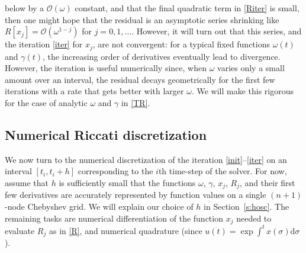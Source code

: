 \documentclass[10pt]{article}
\newcommand{\bigO}{{\mathcal O}}
\newcommand{\om}{\omega}
\newcommand{\g}{\gamma}
\begin{document}
below by a $\bigO(\om)$ constant,
and that the final quadratic term in \eqref{Riter} is small,
then one might hope that the
residual is an asymptotic series
shrinking like $R[x_j] = \bigO(\om^{1-j})$ for $j=0,1,\dots$.
However, it will turn out that this series, and the iteration \cref{iter} for $x_j$, are not convergent:
for a typical fixed functions $\om(t)$ and $\g(t)$,
the increasing order of derivatives eventually lead to divergence.
However, the iteration
is useful numerically since, when $\om$ varies only a small amount
over an interval,
the residual decays geometrically for the first few iterations with a rate that gets better with larger $\om$.
We will make this rigorous for the case of analytic $\om$ and $\g$
in \cref{TR}.

\subsection{Numerical Riccati discretization}

We now turn to the numerical discretization of
the iteration \eqref{init}--\eqref{iter} on an interval
$[t_i,t_i+h]$ corresponding to the $i$th time-step of the solver.
For now, assume that $h$ is sufficiently small that the functions
$\om$, $\g$, $x_j$, $R_j$, and their first few derivatives are accurately
represented by function values on a single $(n+1)$-node Chebyshev grid.
We will explain our choice of $h$ in Section~\ref{s:hosc}.
The remaining tasks are numerical differentiation of the function
$x_j$ needed to evaluate $R_j$ as in \eqref{R}, and
numerical quadrature (since $u(t) = \exp \int^t x(\sigma) \mathrm{d}\sigma$).
\end{document}
